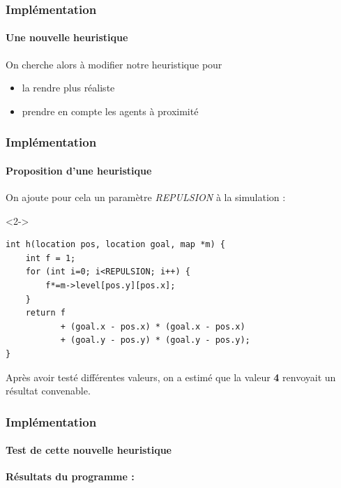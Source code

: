 \begin{frame}
    \frametitle{Implémentation}
    \framesubtitle{Une nouvelle heuristique}

    On cherche alors à modifier notre heuristique pour
    \begin{itemize}
        \item <2-> la rendre plus réaliste
        \item <3-> prendre en compte les agents à proximité
    \end{itemize}

\end{frame}


\begin{frame}[fragile]
    \frametitle{Implémentation}
    \framesubtitle{Proposition d'une heuristique}

    On ajoute pour cela un paramètre \textit{REPULSION} à la simulation :

    \begin{onslide}<2->
    \begin{code}
    \begin{verbatim}
int h(location pos, location goal, map *m) {
    int f = 1;
    for (int i=0; i<REPULSION; i++) {
        f*=m->level[pos.y][pos.x];
    }
    return f
           + (goal.x - pos.x) * (goal.x - pos.x)
           + (goal.y - pos.y) * (goal.y - pos.y);
}
    \end{verbatim}
    \end{code}

    Après avoir testé différentes valeurs, on a estimé que la valeur \textbf{4} renvoyait un résultat convenable.

    \end{onslide}


\end{frame}


\begin{frame}
\frametitle{Implémentation}
\framesubtitle{Test de cette nouvelle heuristique}

\textbf{Résultats du programme :} \\


\begin{figure}
\end{figure}
\end{frame}


